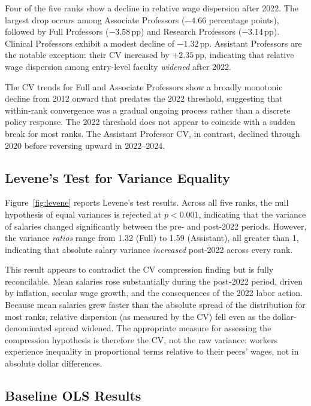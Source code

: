 \documentclass[12pt]{article}
\begin{document}
Four of the five ranks show a decline in relative wage dispersion after
2022. The largest drop occurs among Associate Professors
($-4.66$ percentage points), followed by Full Professors ($-3.58$\,pp)
and Research Professors ($-3.14$\,pp). Clinical Professors exhibit a
modest decline of $-1.32$\,pp. Assistant Professors are the notable
exception: their CV increased by $+2.35$\,pp, indicating that relative
wage dispersion among entry-level faculty \emph{widened} after 2022.

The CV trends for Full and Associate Professors show a broadly
monotonic decline from 2012 onward that predates the 2022 threshold,
suggesting that within-rank convergence was a gradual ongoing process
rather than a discrete policy response. The 2022 threshold does not
appear to coincide with a sudden break for most ranks. The Assistant
Professor CV, in contrast, declined through 2020 before reversing
upward in 2022--2024.

\subsection{Levene's Test for Variance Equality}
\label{subsec:levene}

Figure~\ref{fig:levene} reports Levene's test
results. Across all five ranks, the null hypothesis of equal variances
is rejected at $p < 0.001$, indicating that the variance of salaries
changed significantly between the pre- and post-2022 periods. However,
the variance \emph{ratios} range from 1.32 (Full) to 1.59 (Assistant),
all greater than 1, indicating that absolute salary variance
\emph{increased} post-2022 across every rank.

This result appears to contradict the CV compression finding but is
fully reconcilable. Mean salaries rose substantially during the
post-2022 period, driven by inflation, secular wage growth, and the
consequences of the 2022 labor action. Because mean salaries grew faster
than the absolute spread of the distribution for most ranks, relative
dispersion (as measured by the CV) fell even as the dollar-denominated
spread widened. The appropriate measure for assessing the compression
hypothesis is therefore the CV, not the raw variance: workers experience
inequality in proportional terms relative to their peers' wages, not in
absolute dollar differences.

\subsection{Baseline OLS Results}
\label{subsec:baseline}
\end{document}
